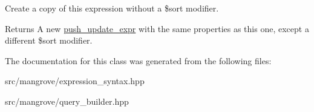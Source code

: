 Create a copy of this expression without a \$sort modifier. 

\begin{DoxyReturn}{Returns}
A new \hyperlink{classmangrove_1_1push__update__expr}{push\+\_\+update\+\_\+expr} with the same properties as this one, except a different \$sort modifier. 
\end{DoxyReturn}


The documentation for this class was generated from the following files\+:\begin{DoxyCompactItemize}
\item 
src/mangrove/expression\+\_\+syntax.\+hpp\item 
src/mangrove/query\+\_\+builder.\+hpp\end{DoxyCompactItemize}

